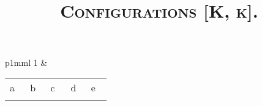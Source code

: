 \documentclass{article}
\title{\textsc{Configurations [K, k].}}
\date{}
\begin{document}
\pagestyle{empty}
\maketitle
\thispagestyle{empty}
\vspace{-1cm}


\begin{tabular}{p{1mm}l}
1 &
\begin{tabular}{*{5}{p{0.15 \linewidth}}}
\hspace{1.5cm} a & \hspace{1.5cm} b & \hspace{1.5cm} c & \hspace{1.5cm} d & \hspace{1.5cm} e \\[-5mm]

\def\piezas{Ka3, kc3}
\setchessboard{setpieces=\piezas}
\chessboard[style=myset]
& 

\def\piezas{kb1,Kb3}
\setchessboard{setpieces=\piezas}
\chessboard[style=myset]
& 

\def\piezas{Ka3, kc1}
\setchessboard{setpieces=\piezas}
\chessboard[style=myset]
& 

\def\piezas{ka1,Kb3}
\setchessboard{setpieces=\piezas}
\chessboard[style=myset]
& 

\def\piezas{Ka3,kc2}
\setchessboard{setpieces=\piezas}
\chessboard[style=myset]
\\ 

\end{tabular}
\end{tabular}
\end{document}
